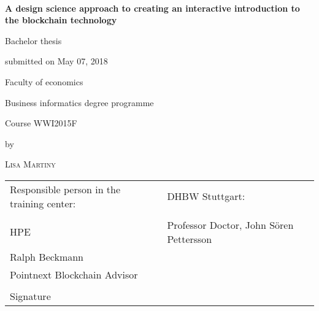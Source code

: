 \newcommand{\typMeinerArbeit}{Bachelor thesis} 

\newcommand{\themaMeinerArbeit}{A design science approach to creating an interactive introduction to the blockchain technology}

\thispagestyle{empty}

\begin{spacing}{1}
\begin{center}	
~\vspace{0mm}

{\sffamily
\LARGE  
\textbf{A design science approach to creating an interactive introduction to the blockchain technology}

}


\vspace{15mm}

{\Large \typMeinerArbeit}

\vspace{1cm}

submitted on May 07, 2018
\vspace{15mm}
\medskip

Faculty of economics
\medskip

Business informatics degree programme
\medskip

Course WWI2015F

\vspace{10mm}

by

\vspace{10mm}

{\large\textsc{Lisa Martiny}}

\vspace{10mm}
\end{center}

\vfill

\begin{tabular}{ll}
Responsible person in the training center: & DHBW Stuttgart: \\
\hspace{0.4\linewidth} & \\
HPE & Professor Doctor, John Sören Pettersson \\
Ralph Beckmann  &  \\
Pointnext Blockchain Advisor \\
\\
Signature \\
\end{tabular}


\vspace{1cm}
\end{spacing}

